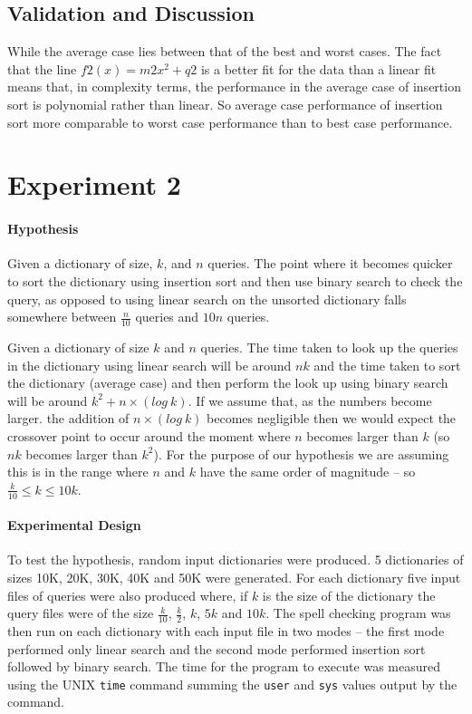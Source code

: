 \documentclass[a4]{article}
\begin{document}
\subsection{Validation and Discussion}

While the average case lies between that of the best and worst cases.  The fact that the line $f2(x) = m2x^2 + q2$ is a better fit for the data than a linear fit means that, in complexity terms, the performance in the average case of insertion sort is polynomial rather than linear.  So average case performance of insertion sort more comparable to worst case performance than to best case performance.


\section{Experiment 2}

\paragraph{Hypothesis} Given a dictionary of size, $k$, and $n$ queries.  The point where it becomes quicker to sort the dictionary using insertion sort and then use binary search to check the query, as opposed to using linear search on the unsorted dictionary falls somewhere between $\frac{n}{10}$ queries and $10n$ queries.

Given a dictionary of size $k$ and $n$ queries.  The time taken to look up the queries in the dictionary using linear search will be around $nk$ and the time taken to sort the dictionary (average case) and then perform the look up using binary search will be around $k^2 + n \times (log~  k)$.  If we assume that, as the numbers become larger. the addition  of $n \times (log~ k)$ becomes negligible then we would expect the crossover point to occur around the moment where $n$ becomes larger than $k$ (so $nk$ becomes larger than $k^2$).  For the purpose of our hypothesis we are assuming this is in the range where $n$ and $k$ have the same order of magnitude -- so $\frac{k}{10} \leq k \leq 10k$.

\paragraph{Experimental Design} To test the hypothesis, random input dictionaries were produced. 5 dictionaries of sizes 10K, 20K, 30K, 40K and 50K were generated.    For each dictionary five input files of queries were also produced where, if $k$ is the size of the dictionary the query files were of the size $\frac{k}{10}$, $\frac{k}{2}$, $k$, $5k$ and $10k$.  The spell checking program was then run on each dictionary with each input file in two modes -- the first mode performed only linear search and the second mode performed insertion sort followed by binary search.  The time for the program to execute was measured using the UNIX \texttt{time} command summing the \texttt{user} and \texttt{sys} values output by the command.  
\end{document}
